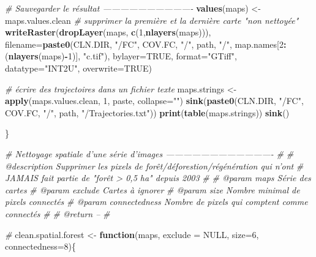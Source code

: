 \documentclass[a4paper, notitlepage, 12pt, krantz2]{krantz}
\newenvironment{Shaded}{\begin{snugshade}}{\end{snugshade}}
\newcommand{\CommentTok}[1]{\textcolor[rgb]{0.56,0.35,0.01}{\textit{#1}}}
\newcommand{\ControlFlowTok}[1]{\textcolor[rgb]{0.13,0.29,0.53}{\textbf{#1}}}
\newcommand{\DataTypeTok}[1]{\textcolor[rgb]{0.13,0.29,0.53}{#1}}
\newcommand{\DecValTok}[1]{\textcolor[rgb]{0.00,0.00,0.81}{#1}}
\newcommand{\KeywordTok}[1]{\textcolor[rgb]{0.13,0.29,0.53}{\textbf{#1}}}
\newcommand{\NormalTok}[1]{#1}
\newcommand{\OperatorTok}[1]{\textcolor[rgb]{0.81,0.36,0.00}{\textbf{#1}}}
\newcommand{\OtherTok}[1]{\textcolor[rgb]{0.56,0.35,0.01}{#1}}
\newcommand{\StringTok}[1]{\textcolor[rgb]{0.31,0.60,0.02}{#1}}
\begin{document}
\begin{Shaded}
\begin{Highlighting}[]
{{{  \CommentTok{# Sauvegarder le résultat -------------------------------}
  \KeywordTok{values}\NormalTok{(maps) <-}\StringTok{ }\NormalTok{maps.values.clean}
  \CommentTok{# supprimer la première et la dernière carte "non nettoyée"}
  \KeywordTok{writeRaster}\NormalTok{(}\KeywordTok{dropLayer}\NormalTok{(maps, }\KeywordTok{c}\NormalTok{(}\DecValTok{1}\NormalTok{,}\KeywordTok{nlayers}\NormalTok{(maps))), }
              \DataTypeTok{filename=}\KeywordTok{paste0}\NormalTok{(CLN.DIR, }\StringTok{"/FC"}\NormalTok{, COV.FC, }\StringTok{"/"}\NormalTok{, path, }\StringTok{"/"}\NormalTok{, map.names[}\DecValTok{2}\OperatorTok{:}\NormalTok{(}\KeywordTok{nlayers}\NormalTok{(maps)}\OperatorTok{-}\DecValTok{1}\NormalTok{)], }\StringTok{"c.tif"}\NormalTok{), }
              \DataTypeTok{bylayer=}\OtherTok{TRUE}\NormalTok{, }\DataTypeTok{format=}\StringTok{"GTiff"}\NormalTok{, }\DataTypeTok{datatype=}\StringTok{"INT2U"}\NormalTok{, }\DataTypeTok{overwrite=}\OtherTok{TRUE}\NormalTok{)}
  
  \CommentTok{# écrire des trajectoires dans un fichier texte}
\NormalTok{  maps.strings <-}\StringTok{ }\KeywordTok{apply}\NormalTok{(maps.values.clean, }\DecValTok{1}\NormalTok{, paste, }\DataTypeTok{collapse=}\StringTok{""}\NormalTok{)}
  \KeywordTok{sink}\NormalTok{(}\KeywordTok{paste0}\NormalTok{(CLN.DIR, }\StringTok{"/FC"}\NormalTok{, COV.FC, }\StringTok{"/"}\NormalTok{, path, }\StringTok{"/Trajectories.txt"}\NormalTok{))}
  \KeywordTok{print}\NormalTok{(}\KeywordTok{table}\NormalTok{(maps.strings))}
  \KeywordTok{sink}\NormalTok{()}

\NormalTok{\}}


\CommentTok{# Nettoyage spatiale d'une série d'images -------------------------------------}
\CommentTok{#}
\CommentTok{# @description Supprimer les pixels de forêt/déforestion/régénération qui n'ont }
\CommentTok{#              JAMAIS fait partie de "forêt > 0,5 ha" depuis 2003}
\CommentTok{#}
\CommentTok{# @param maps           Série des cartes}
\CommentTok{# @param exclude        Cartes à ignorer}
\CommentTok{# @param size           Nombre minimal de pixels connectés}
\CommentTok{# @param connectedness  Nombre de pixels qui comptent comme connectés}
\CommentTok{#}
\CommentTok{# @return       -- }
\CommentTok{#}

\CommentTok{# }
\NormalTok{clean.spatial.forest <-}\StringTok{ }\ControlFlowTok{function}\NormalTok{(maps, }\DataTypeTok{exclude =} \OtherTok{NULL}\NormalTok{, }\DataTypeTok{size=}\DecValTok{6}\NormalTok{, }\DataTypeTok{connectedness=}\DecValTok{8}\NormalTok{)\{}
  
}}}
\end{Highlighting}
\end{Shaded}
\end{document}
